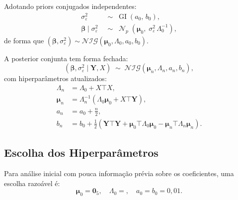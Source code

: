 \documentclass[12pt, a4paper]{article}
\newcommand{\T}{{\top}}
\newcommand{\mY}{\mathbf{Y}}
\newcommand{\mb}{\boldsymbol{\beta}}
\DeclareMathOperator{\GI}{GI}
\DeclareMathOperator{\Normal}{\mathcal{N}}
\newcommand{\sig}{\sigma^{2}_{\varepsilon}}
\begin{document}
Adotando priors conjugados independentes:
\begin{align}
  \sig   &\;\sim\; \GI(a_0,\, b_0),
  \label{eq:prior_sig} \\[4pt]
  \mb \mid \sig &\;\sim\; \Normal_p\!\left(
                    \boldsymbol{\mu}_0,\;
                    \sig\,\Lambda_0^{-1}
                  \right),
  \label{eq:prior_beta}
\end{align}
de forma que $(\mb, \sig) \sim \mathcal{NIG}(\boldsymbol{\mu}_0, \Lambda_0, a_0, b_0)$.
 
A posterior conjunta tem forma fechada:
\[
  (\mb, \sig \mid \mY, X)
  \;\sim\;
  \mathcal{NIG}(\boldsymbol{\mu}_n, \Lambda_n, a_n, b_n),
\]
com hiperparâmetros atualizados:
\begin{align}
  \Lambda_n      &= \Lambda_0 + X\T X, \\
  \boldsymbol{\mu}_n &= \Lambda_n^{-1}
                        (\Lambda_0\boldsymbol{\mu}_0 + X\T\mY), \\
  a_n            &= a_0 + \frac{n}{2}, \\
  b_n            &= b_0 + \frac{1}{2}
                    \!\left(
                      \mY\T\mY
                      + \boldsymbol{\mu}_0\T\Lambda_0\boldsymbol{\mu}_0
                      - \boldsymbol{\mu}_n\T\Lambda_n\boldsymbol{\mu}_n
                    \right).
\end{align}
 
 
\subsection*{Escolha dos Hiperparâmetros}
 
Para análise inicial com pouca informação prévia sobre os coeficientes, uma
escolha razoável é:
\[
  \boldsymbol{\mu}_0 = \mathbf{0}_5,
  \quad
  \Lambda_0 = ,
  \quad
  a_0 = b_0 = 0{,}01.
\]

 
\end{document}
